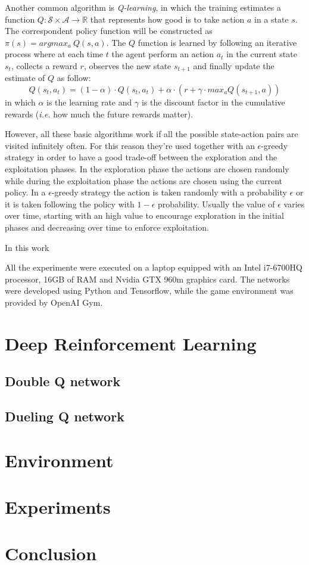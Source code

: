 \documentclass[article,11pt]{article}
\begin{document}
	Another common algorithm is \textit{Q-learning}, in which the training estimates a function $Q: \mathcal{S}\times\mathcal{A}\to\mathbb{R}$ that represents how good is to take action $a$ in a state $s$. The correspondent policy function will be constructed as $\pi(s) = argmax_{a}\ Q(s, a)$. The $Q$ function is learned by following an iterative process where at each time $t$ the agent perform an action $a_t$ in the current state $s_t$, collects a reward $r$, observes the new state $s_{t+1}$ and finally update the estimate of $Q$ as follow:
	\begin{equation}
		Q(s_t, a_t) = (1-\alpha)\cdot Q(s_t, a_t) + \alpha \cdot (r + \gamma\cdot max_aQ(s_{t+1}, a))
	\end{equation}
	in which $\alpha$ is the learning rate and $\gamma$ is the discount factor in the cumulative rewards (\textit{i.e.} how much the future rewards matter).
	
	However, all these basic algorithms work if all the possible state-action pairs are visited infinitely often. For this reason they're used together with an $\epsilon$-greedy strategy in order to have a good trade-off between the exploration and the exploitation phases. In the exploration phase the actions are chosen randomly while during the exploitation phase the actions are chosen using the current policy. In a $\epsilon$-greedy strategy the action is taken randomly with a probability $\epsilon$ or it is taken following the policy with $1-\epsilon$ probability. Usually the value of $\epsilon$ varies over time, starting with an high value to encourage exploration in the initial phases and decreasing over time to enforce exploitation.
	
	
	
	In this work 
	
	All the experimente were executed on a laptop equipped with an Intel i7-6700HQ processor, 16GB of RAM and Nvidia GTX 960m graphics card. The networks were developed using Python and Tensorflow, while the game environment was provided by OpenAI Gym.
	\section{Deep Reinforcement Learning}

	\subsection{Double Q network}
	
	\subsection{Dueling Q network}
	
	\section{Environment}
	
	\section{Experiments}
	
	\section{Conclusion}

	
	
	
\end{document}
